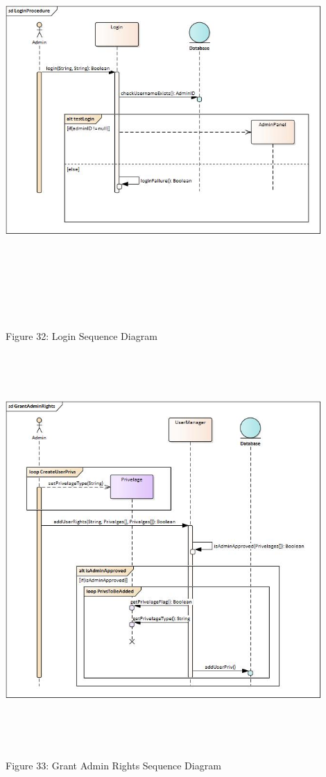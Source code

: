     \includegraphics[width=12cm,height=15cm,keepaspectratio]{admin_ui/images/sequence_diagrams/LoginProcedure.jpg}
		\begin{center}
	    \small{Figure 32: Login Sequence Diagram}
    \end{center}
    
    \includegraphics[width=12cm,height=15cm,keepaspectratio]{admin_ui/images/sequence_diagrams/GrantAdminRights.jpg}
		\begin{center}
	    \small{Figure 33: Grant Admin Rights Sequence Diagram}
    \end{center}
    
